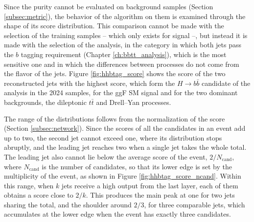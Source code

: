 Since the purity cannot be evaluated on background samples (Section \ref{subsec:metric}), the behavior of the algorithm on them is examined through the shape of its score distribution. This comparison cannot be made with the selection of the training samples -- which only exists for signal --, but instead it is made with the selection of the analysis, in the category in which both jets pass the $b$ tagging requirement (Chapter \ref{ch:bbtt_analysis}), which is the most sensitive one and in which the differences between processes do not come from the flavor of the jets. Figure \ref{fig:hhbtag_score} shows the score of the two reconstructed jets with the highest score, which form the $H\to b\bar{b}$ candidate of the analysis in the 2024 samples, for the ggF SM signal and for the two dominant backgrounds, the dileptonic $t\bar{t}$ and Drell--Yan processes.




The range of the distributions follows from the normalization of the score (Section \ref{subsec:network}). Since the scores of all the candidates in an event add up to two, the second jet cannot exceed one, where its distribution stops abruptly, and the leading jet reaches two when a single jet takes the whole total. The leading jet also cannot lie below the average score of the event, $2/N_\text{cand}$, where $N_\text{cand}$ is the number of candidates, so that its lower edge is set by the multiplicity of the event, as shown in Figure \ref{fig:hhbtag_score_ncand}. Within this range, when $k$ jets receive a high output from the last layer, each of them obtains a score close to $2/k$. This produces the main peak at one for two jets sharing the total, and the shoulder around $2/3$, for three comparable jets, which accumulates at the lower edge when the event has exactly three candidates.


